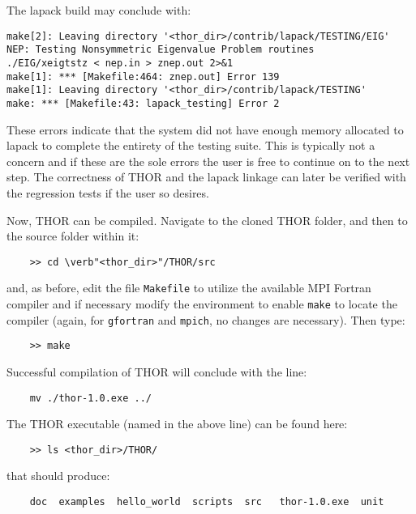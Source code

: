 The lapack build may conclude with:
\begin{verbatim}
make[2]: Leaving directory '<thor_dir>/contrib/lapack/TESTING/EIG'
NEP: Testing Nonsymmetric Eigenvalue Problem routines
./EIG/xeigtstz < nep.in > znep.out 2>&1
make[1]: *** [Makefile:464: znep.out] Error 139
make[1]: Leaving directory '<thor_dir>/contrib/lapack/TESTING'
make: *** [Makefile:43: lapack_testing] Error 2
\end{verbatim}
These errors indicate that the system did not have enough memory allocated to lapack to complete the entirety of the testing suite.
This is typically not a concern and if these are the sole errors the user is free to continue on to the next step.
The correctness of THOR and the lapack linkage can later be verified with the regression tests if the user so desires.

Now, THOR can be compiled. Navigate to the cloned THOR folder, and then to the source folder within it:
\begin{verbatim}
    >> cd \verb"<thor_dir>"/THOR/src
\end{verbatim}
and, as before, edit the file \verb"Makefile" to utilize the available MPI Fortran compiler and if necessary modify the environment to enable \verb"make" to locate the compiler (again, for {\tt gfortran} and {\tt mpich}, no changes are necessary).
Then type:
\begin{verbatim}
    >> make
\end{verbatim}
Successful compilation of THOR will conclude with the line:
\begin{verbatim}
    mv ./thor-1.0.exe ../
\end{verbatim}
The THOR executable (named in the above line) can be found here:
\begin{verbatim}
    >> ls <thor_dir>/THOR/
\end{verbatim}
that should produce:
\begin{verbatim}
    doc  examples  hello_world  scripts  src   thor-1.0.exe  unit
\end{verbatim}

